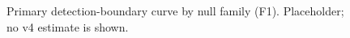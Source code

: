 \begin{figure}[t]
\centering{}
\caption{Primary detection-boundary curve by null family (F1). Placeholder; no v4 estimate is shown.}\label{fig:v4-F1}
\end{figure}
